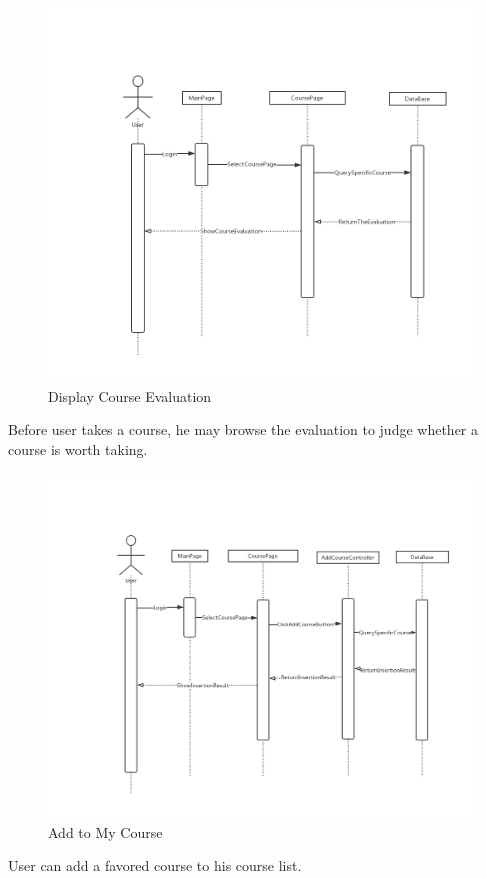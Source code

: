 \documentclass[16pt]{scrreprt}
\begin{document}
\begin{figure}[H]
    \includegraphics[width=\linewidth]{./FuncPhoto/9.png}   
    \caption{Display Course Evaluation}
\end{figure}
Before user takes a course, he may browse the evaluation to judge whether a course is worth taking.

\begin{figure}[H]
    \includegraphics[width=\linewidth]{./FuncPhoto/10.png}   
    \caption{Add to My Course}
\end{figure}
User can add a favored course to his course list.
\end{document}
